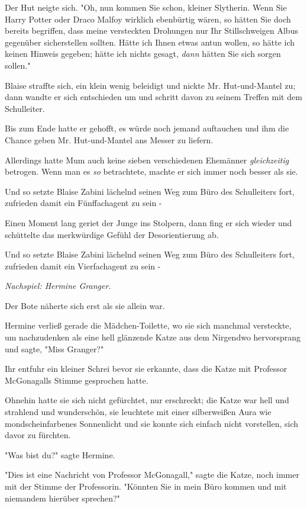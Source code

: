 {Der Hut neigte sich. "Oh, nun kommen Sie schon, kleiner Slytherin. Wenn Sie Harry Potter oder Draco Malfoy wirklich ebenbürtig wären, so hätten Sie doch bereits begriffen, dass meine versteckten Drohungen nur Ihr Stillschweigen Albus gegenüber sicherstellen sollten. Hätte ich Ihnen etwas antun wollen, so hätte ich keinen Hinweis gegeben; hätte ich nichts gesagt, \emph{dann} hätten Sie sich sorgen sollen."

Blaise straffte sich, ein klein wenig beleidigt und nickte Mr. Hut-und-Mantel zu; dann wandte er sich entschieden um und schritt davon zu seinem Treffen mit dem Schulleiter.

Bis zum Ende hatte er gehofft, es würde noch jemand auftauchen und ihm die Chance geben Mr. Hut-und-Mantel ans Messer zu liefern.

Allerdings hatte Mum auch keine sieben verschiedenen Ehemänner \emph{gleichzeitig} betrogen. Wenn man es \emph{so} betrachtete, machte er sich immer noch besser als sie.

Und so setzte Blaise Zabini lächelnd seinen Weg zum Büro des Schulleiters fort, zufrieden damit ein Fünffachagent zu sein -

Einen Moment lang geriet der Junge ins Stolpern, dann fing er sich wieder und schüttelte das merkwürdige Gefühl der Desorientierung ab.

Und so setzte Blaise Zabini lächelnd seinen Weg zum Büro des Schulleiters fort, zufrieden damit ein Vierfachagent zu sein -

\later

\emph{Nachspiel: Hermine Granger.}

Der Bote näherte sich erst als sie allein war.

Hermine verließ gerade die Mädchen-Toilette, wo sie sich manchmal versteckte, um nachzudenken als eine hell glänzende Katze aus dem Nirgendwo hervorsprang und sagte, "Miss Granger?"

Ihr entfuhr ein kleiner Schrei bevor sie erkannte, dass die Katze mit Professor McGonagalls Stimme gesprochen hatte.

Ohnehin hatte sie sich nicht gefürchtet, nur erschreckt; die Katze war hell und strahlend und wunderschön, sie leuchtete mit einer silberweißen Aura wie mondscheinfarbenes Sonnenlicht und sie konnte sich einfach nicht vorstellen, sich davor zu fürchten.

"Was bist du?" sagte Hermine.

"Dies ist eine Nachricht von Professor McGonagall," sagte die Katze, noch immer mit der Stimme der Professorin. "Könnten Sie in mein Büro kommen und mit niemandem hierüber sprechen?"

}
